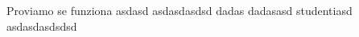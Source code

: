 \documentclass{article}
\begin{document}
Proviamo se funziona asdasd asdasdasdsd
dadas
dadasasd
studentiasd
asdasdasdsdsd
\end{document}

